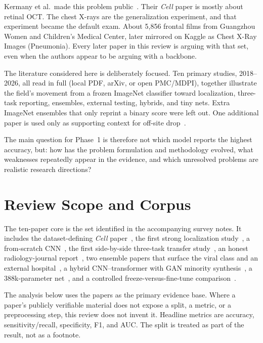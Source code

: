 \documentclass[11pt,a4paper]{article}
\begin{document}
Kermany et al.\ made this problem public~\cite{kermany2018}. Their \textit{Cell} paper is mostly about retinal OCT. The chest X-rays are the generalization experiment, and that experiment became the default exam. About 5{,}856 frontal films from Guangzhou Women and Children's Medical Center, later mirrored on Kaggle as Chest X-Ray Images (Pneumonia). Every later paper in this review is arguing with that set, even when the authors appear to be arguing with a backbone.

The literature considered here is deliberately focused. Ten primary studies, 2018--2026, all read in full (local PDF, arXiv, or open PMC/MDPI), together illustrate the field's movement from a frozen ImageNet classifier toward localization, three-task reporting, ensembles, external testing, hybrids, and tiny nets. Extra ImageNet ensembles that only reprint a binary score were left out. One additional paper is used only as supporting context for off-site drop~\cite{xin2021}.

The main question for Phase~1 is therefore not which model reports the highest accuracy, but: how has the problem formulation and methodology evolved, what weaknesses repeatedly appear in the evidence, and which unresolved problems are realistic research directions?

\section{Review Scope and Corpus}
The ten-paper core is the set identified in the accompanying survey notes. It includes the dataset-defining \textit{Cell} paper~\cite{kermany2018}, the first strong localization study~\cite{rajaraman2018}, a from-scratch CNN~\cite{stephen2019}, the first side-by-side three-task transfer study~\cite{rahman2020}, an honest radiology-journal report~\cite{salehi2021}, two ensemble papers that surface the viral class and an external hospital~\cite{ayan2021,kundu2021}, a hybrid CNN--transformer with GAN minority synthesis~\cite{raghaw2024}, a 388k-parameter net~\cite{chauhan2025}, and a controlled freeze-versus-fine-tune comparison~\cite{choudhury2026}.

The analysis below uses the papers as the primary evidence base. Where a paper's publicly verifiable material does not expose a split, a metric, or a preprocessing step, this review does not invent it. Headline metrics are accuracy, sensitivity/recall, specificity, F1, and AUC. The split is treated as part of the result, not as a footnote.
\end{document}

